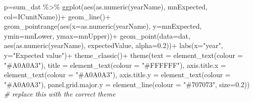 \documentclass[
]{book}
\newenvironment{Shaded}{\begin{snugshade}}{\end{snugshade}}
\newcommand{\AttributeTok}[1]{\textcolor[rgb]{0.77,0.63,0.00}{#1}}
\newcommand{\CommentTok}[1]{\textcolor[rgb]{0.56,0.35,0.01}{\textit{#1}}}
\newcommand{\FloatTok}[1]{\textcolor[rgb]{0.00,0.00,0.81}{#1}}
\newcommand{\FunctionTok}[1]{\textcolor[rgb]{0.00,0.00,0.00}{#1}}
\newcommand{\NormalTok}[1]{#1}
\newcommand{\OtherTok}[1]{\textcolor[rgb]{0.56,0.35,0.01}{#1}}
\newcommand{\SpecialCharTok}[1]{\textcolor[rgb]{0.00,0.00,0.00}{#1}}
\newcommand{\StringTok}[1]{\textcolor[rgb]{0.31,0.60,0.02}{#1}}
\begin{document}
\begin{Shaded}
\begin{Highlighting}[]
\NormalTok{p}\OtherTok{=}\NormalTok{sum\_dat }\SpecialCharTok{\%\textgreater{}\%} 
  \FunctionTok{ggplot}\NormalTok{(}\FunctionTok{aes}\NormalTok{(}\FunctionTok{as.numeric}\NormalTok{(yearName), mnExpected, }\AttributeTok{col=}\NormalTok{ICunitName))}\SpecialCharTok{+}
  \FunctionTok{geom\_line}\NormalTok{()}\SpecialCharTok{+}
  \FunctionTok{geom\_pointrange}\NormalTok{(}\FunctionTok{aes}\NormalTok{(}\AttributeTok{x=}\FunctionTok{as.numeric}\NormalTok{(yearName), }\AttributeTok{y=}\NormalTok{mnExpected, }\AttributeTok{ymin=}\NormalTok{mnLower, }\AttributeTok{ymax=}\NormalTok{mnUpper))}\SpecialCharTok{+}
  \FunctionTok{geom\_point}\NormalTok{(}\AttributeTok{data=}\NormalTok{dat, }\FunctionTok{aes}\NormalTok{(}\FunctionTok{as.numeric}\NormalTok{(yearName), expectedValue, }\AttributeTok{alpha=}\FloatTok{0.2}\NormalTok{))}\SpecialCharTok{+}
  \FunctionTok{labs}\NormalTok{(}\AttributeTok{x=}\StringTok{"year"}\NormalTok{, }\AttributeTok{y=}\StringTok{"Expected value"}\NormalTok{)}\SpecialCharTok{+}
  \FunctionTok{theme\_classic}\NormalTok{()}\SpecialCharTok{+}
  \FunctionTok{theme}\NormalTok{(}\AttributeTok{text =} \FunctionTok{element\_text}\NormalTok{(}\AttributeTok{colour =} \StringTok{"\#A0A0A3"}\NormalTok{), }
        \AttributeTok{title =} \FunctionTok{element\_text}\NormalTok{(}\AttributeTok{colour =} \StringTok{"\#FFFFFF"}\NormalTok{), }
\AttributeTok{axis.title.x =} \FunctionTok{element\_text}\NormalTok{(}\AttributeTok{colour =} \StringTok{"\#A0A0A3"}\NormalTok{), }
\AttributeTok{axis.title.y =} \FunctionTok{element\_text}\NormalTok{(}\AttributeTok{colour =} \StringTok{"\#A0A0A3"}\NormalTok{), }
\AttributeTok{panel.grid.major.y =} \FunctionTok{element\_line}\NormalTok{(}\AttributeTok{colour =} \StringTok{"\#707073"}\NormalTok{, }\AttributeTok{size=}\FloatTok{0.2}\NormalTok{)) }\CommentTok{\# replace this with the correct theme}


\end{Highlighting}
\end{Shaded}
\end{document}
